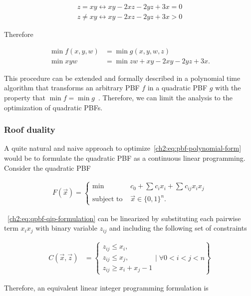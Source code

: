  \begin{align*}
 	z=xy \leftrightarrow  xy -2xz-2yz+3x=0 \\
 	z \neq xy \leftrightarrow  xy -2xz-2yz+3x>0
 \end{align*}
 
 Therefore
 
\begin{align*}
	\min f(x,y,w) &= \min g(x,y,w,z) \\
    \min xyw &= \min zw + xy -2xy -2yz +3x .
\end{align*} 

  This procedure can be extended and formally described in a polynomial time algorithm that transforms an arbitrary PBF $f$ in a quadratic PBF $g$ with the property that $\min f = \min g$~\cite{boros02pseudo}. Therefore, we can limit the analysis to the optimization of quadratic PBFs.
  
\subsubsection{Roof duality}

A quite natural and naive approach to optimize~\cref{ch2:eq:pbf-polynomial-form} would be to formulate the quadratic PBF as a continuous linear programming. Consider the quadratic PBF

\begin{align}
	F(\vec{x}) = \left\{ \begin{array}{rl}
		\min &c_0 + \sum_{}{c_ix_i} + \sum_{}{c_{ij}x_ix_j} \\
	\text{subject to }& \vec{x} \in \{0,1\}^n.
	\end{array}\right.
	\label{ch2:eq:qpbf-qip-formulation}
\end{align}

~\cref{ch2:eq:qpbf-qip-formulation} can be linearized by substituting each pairwise term $x_ix_j$ with binary variable $z_{ij}$ and including the following set of constraints 

\begin{align*}
	C(\vec{x},\vec{z}) &= \left\{  \begin{array}{l}
	z_{ij} \leq x_i, \\
	z_{ij} \leq x_j, \\
	z_{ij} \geq x_i + x_j - 1 
	\end{array} \Bigg|\; \forall 0<i<j<n \right\}
\end{align*}

Therefore, an equivalent linear integer programming formulation is

